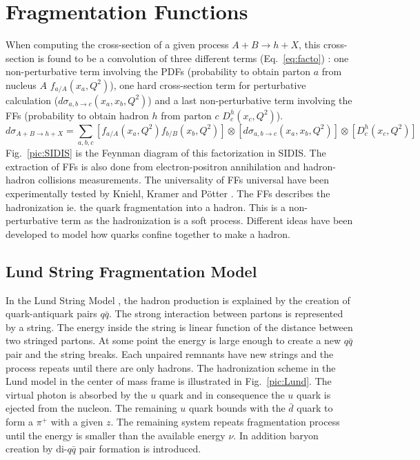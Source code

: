 
\section{Fragmentation Functions}\label{sec:FF}

When computing the cross-section of a given process $A+B \rightarrow h+X$, this cross-section is found to be a convolution of three different terms (Eq.~\ref{eq:facto}) : one non-perturbative term involving the PDFs (probability to obtain parton $a$ from nucleus $A$ $f_{a/A}(x_a,Q^2)$), one hard cross-section term for perturbative calculation ($d\sigma_{a,b \rightarrow c}(x_a,x_b,Q^2)$) and a last non-perturbative term involving the FFs (probability to obtain hadron $h$ from parton $c$ $D^h_c(x_c,Q^2)$).
%
\begin{equation}
  d\sigma_{A+B \rightarrow h+X} = \sum_{a,b,c} \left[ f_{a/A}(x_a,Q^2) f_{b/B}(x_b,Q^2) \right] \otimes \left[ d\sigma_{a,b \rightarrow c}(x_a,x_b,Q^2) \right] \otimes \left[ D^h_c(x_c,Q^2) \right]
  \label{eq:facto}
\end{equation}
%
Fig.~\ref{pic:SIDIS} is the Feynman diagram of this factorization in SIDIS. The extraction of FFs is also done from electron-positron annihilation and hadron-hadron collisions measurements. The universality of FFs universal have been experimentally tested by Kniehl, Kramer and Pötter \cite{Universality}.
The FFs describes the hadronization ie. the quark fragmentation into a hadron. This is a non-perturbative term as the hadronization is a soft process.
Different ideas have been developed to model how quarks confine together to make a hadron.

\subsection{Lund String Fragmentation Model}

In the Lund String Model \cite{LUND}, the hadron production is explained by the creation of quark-antiquark pairs $q\bar{q}$. The strong interaction between partons is represented by a string. The energy inside the string is linear function of the distance between two stringed partons. At some point the energy is large enough to create a new $q\bar{q}$ pair and the string breaks. Each unpaired remnants have new strings and the process repeats until there are only hadrons. The hadronization scheme in the Lund model in the center of mass frame is illustrated in Fig.~\ref{pic:Lund}. The virtual photon is absorbed by the $u$ quark and in consequence the $u$ quark is ejected from the nucleon. The remaining $u$ quark bounds with the $\bar{d}$ quark to form a $\pi^+$ with a given $z$. The remaining system repeats fragmentation process until the energy is smaller than the available energy $\nu$. In addition baryon creation by di-$q\bar{q}$ pair formation is introduced.

